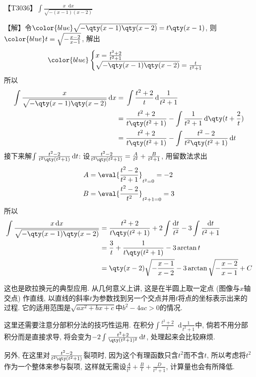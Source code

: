 \documentclass{ctexbook}
\newcommand*{\dif}{\mathop{}\!\mathrm{d}}
\begin{document}
{【T3036】$\int\frac{x\dif{x}}{\sqrt{-\left(x-1\right)\left(x-2\right)}}$\par
【解】令$\color{blue}\sqrt{-\qty(x-1)\qty(x-2)}=t\qty(x-1)$, 则$\color{blue}t=\sqrt{-\frac{x-2}{x-1}}$, 解出
\begin{align*}\color{blue}
\begin{cases}
x=\frac{t^{2}+2}{t^{2}+1}\\
\sqrt{-\qty(x-1)\qty(x-2)}=\frac{t}{t^{2}+1}
\end{cases}
\end{align*}
所以
\begin{align*}
\int\frac{x}{\sqrt{-\qty(x-1)\qty(x-2)}}\dif{x}={}&\int\frac{t^{2}+2}{t}\dif{\frac{1}{t^{2}+1}}\\
={}&\frac{t^{2}+2}{t\qty(t^{2}+1)}-\int\frac{1}{t^{2}+1}\dif{\qty(t+\frac{2}{t})}\\
={}&\frac{t^{2}+2}{t\qty(t^{2}+1)}-\int\frac{t^{2}-2}{t^{2}\qty(t^{2}+1)}\dif{t}
\end{align*}
接下来解$\int\frac{t^{2}-2}{t^{2}\qty(t^{2}+1)}\dif{t}$: 设$\frac{t^{2}-2}{t^{2}\qty(t^{2}+1)}=\frac{A}{t^{2}}+\frac{B}{t^{2}+1}$, 用留数法求出
\begin{align*}
A={}&\eval{\frac{t^{2}-2}{t^{2}+1}}_{t^{2}=0}=-2\\
B={}&\eval{\frac{t^{2}-2}{t^{2}}}_{t^{2}+1=0}=3
\end{align*}
所以
\begin{align*}
\int\frac{x\dif{x}}{\sqrt{-\qty(x-1)\qty(x-2)}}={}&\frac{t^{2}+2}{t\qty(t^{2}+1)}+2\int\frac{\dif{t}}{t^{2}}-3\int\frac{\dif{t}}{t^{2}+1}\\
={}&\frac{3}{t}+\frac{1}{t\qty(t^{2}+1)}-3\arctan{t}\\
={}&\qty(x-2)\sqrt{-\frac{x-1}{x-2}}-3\arctan{\sqrt{-\frac{x-2}{x-1}}}+C
\end{align*}\par
{\kaishu 这也是欧拉换元的典型应用. 从几何意义上讲, 这是在半圆上取一定点 (图像与$x$轴交点) 作直线, 以直线的斜率$t$为参数找到另一个交点并用$t$将点的坐标表示出来的过程. 它的适用范围是$\sqrt{ax^{2}+bx+c}$中$b^{2}-4ac>0$的情况. \par
这里还需要注意分部积分法的技巧性运用. 在积分$\int\frac{t^{2}+2}{t}\dif{\frac{1}{t^{2}+1}}$中, 倘若不用分部积分而是直接求导, 将会变为$-2\int\frac{t^{2}+2}{\qty(t^{2}+1)^{2}}\dif{t}$, 处理起来会比较麻烦. \par
另外, 在这里对$\frac{t^{2}-2}{t^{2}\qty(t^{2}+1)}$裂项时, 因为这个有理函数只含$t^{2}$而不含$t$, 所以考虑将$t^{2}$作为一个整体来参与裂项, 这样就无需设$\frac{A}{t^{2}}+\frac{B}{t}+\frac{D}{t^{2}+1}$, 计算量也会有所降低. \par}
}
\end{document}
